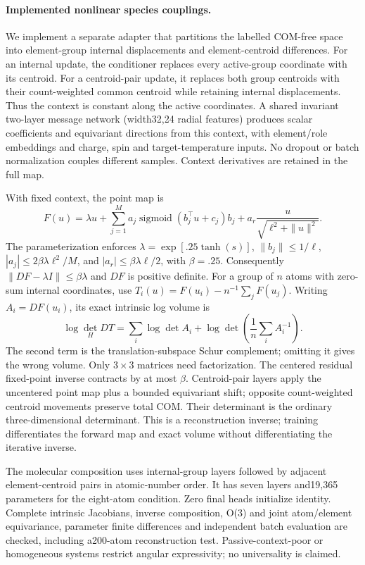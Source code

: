 \paragraph{Implemented nonlinear species couplings.}
We implement a separate adapter that partitions the labelled COM-free space
into element-group internal displacements and element-centroid differences.
For an internal update, the conditioner replaces every active-group coordinate
with its centroid. For a centroid-pair update, it replaces both group centroids
with their count-weighted common centroid while retaining internal displacements.
Thus the context is constant along the active coordinates. A shared invariant
two-layer message network (width32,24 radial features) produces scalar coefficients
and equivariant directions from this context, with element/role embeddings and
charge, spin and target-temperature inputs. No dropout or batch normalization
couples different samples. Context derivatives are retained in the full map.

With fixed context, the point map is
\[
 F(u)=\lambda u+\sum_{j=1}^{M}a_j\operatorname{sigmoid}(b_j^\top u+c_j)b_j
       +a_r\frac{u}{\sqrt{\ell^2+\|u\|^2}}.
\]
The parameterization enforces $\lambda=\exp[.25\tanh(s)]$,
$\|b_j\|\leq1/\ell$, $|a_j|\leq2\beta\lambda\ell^2/M$,
and $|a_r|\leq\beta\lambda\ell/2$, with $\beta=.25$.
Consequently $\|DF-\lambda I\|\leq\beta\lambda$ and $DF$ is positive definite.
For a group of $n$ atoms with zero-sum internal coordinates, use
$T_i(u)=F(u_i)-n^{-1}\sum_jF(u_j)$. Writing $A_i=DF(u_i)$, its exact
intrinsic log volume is
\[
 \log\det_H DT=\sum_i\log\det A_i+
       \log\det\!\left(\frac1n\sum_i A_i^{-1}\right).
\]
The second term is the translation-subspace Schur complement; omitting it
gives the wrong volume. Only $3\times3$ matrices need factorization.
The centered residual fixed-point inverse contracts by at most $\beta$.
Centroid-pair layers apply the uncentered point map plus a bounded equivariant
shift; opposite count-weighted centroid movements preserve total COM.
Their determinant is the ordinary three-dimensional determinant. This is
a reconstruction inverse; training differentiates the forward map and exact
volume without differentiating the iterative inverse.

The molecular composition uses internal-group layers followed by adjacent
element-centroid pairs in atomic-number order. It has seven layers and19,365
parameters for the eight-atom condition. Zero final heads initialize identity.
Complete intrinsic Jacobians, inverse composition, O(3) and joint atom/element
equivariance, parameter finite differences and independent batch evaluation
are checked, including a200-atom reconstruction test. Passive-context-poor or
homogeneous systems restrict angular expressivity; no universality is claimed.

